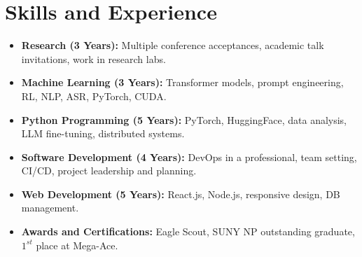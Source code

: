 \documentclass[11pt]{article}
\begin{document}
\section*{Skills and Experience}
\begin{itemize}
    \itemsep0em
    
    \item \textbf{Research (3 Years):} Multiple conference acceptances, academic talk invitations, work in research labs.
    \item \textbf{Machine Learning (3 Years):} Transformer models, prompt engineering, RL, NLP, ASR, PyTorch, CUDA.
    \item \textbf{Python Programming (5 Years):} PyTorch, HuggingFace, data analysis, LLM fine-tuning, distributed systems.
    \item \textbf{Software Development (4 Years):} DevOps in a professional, team setting, CI/CD, project leadership and planning.
    \item \textbf{Web Development (5 Years):} React.js, Node.js, responsive design, DB management.
    \item \textbf{Awards and Certifications:} Eagle Scout, SUNY NP outstanding graduate, $1^{st}$ place at Mega-Ace.

\end{itemize}
\end{document}
